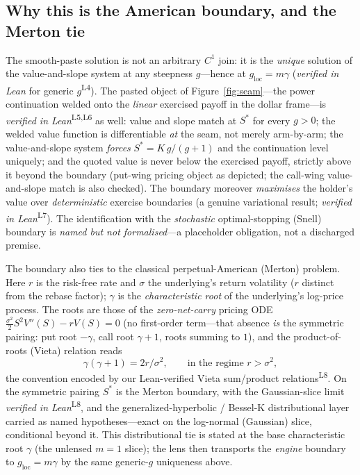 \documentclass[runningheads]{llncs}
\newcommand{\tfp}{\emph{verified in Lean}}
\begin{document}
\subsection{Why this is the American boundary, and the Merton tie}
The smooth-paste solution is not an arbitrary $C^{1}$ join: it is the
\emph{unique} solution of the value-and-slope system at any steepness $g$---hence
at $g_{\mathrm{loc}}=m\gamma$ (\tfp{} for generic $g$\textsuperscript{L4}). The pasted object of Figure~\ref{fig:seam}---the
power continuation welded onto the \emph{linear} exercised payoff in the dollar
frame---is \tfp{}\textsuperscript{L5,L6} as well: value and
slope match at $S^{\ast}$ for every $g>0$; the welded value function is
differentiable \emph{at} the seam, not merely arm-by-arm; the value-and-slope
system \emph{forces} $S^{\ast}=K\,g/(g+1)$ and the continuation level uniquely;
and the quoted value is never below the exercised payoff, strictly above it beyond
the boundary (put-wing pricing object as depicted; the call-wing value-and-slope
match is also checked). The boundary moreover \emph{maximises} the holder's value
over \emph{deterministic} exercise boundaries (a genuine variational result;
\tfp{}\textsuperscript{L7}). The identification with the \emph{stochastic}
optimal-stopping (Snell) boundary is \emph{named but not formalised}---a
placeholder obligation, not a discharged premise.

The boundary also ties to the classical perpetual-American (Merton) problem. Here
$r$ is the risk-free rate and $\sigma$ the underlying's return volatility ($r$
distinct from the rebase factor); $\gamma$ is the \emph{characteristic root} of
the underlying's log-price process. The roots are those of the
\emph{zero-net-carry} pricing ODE
$\tfrac{\sigma^{2}}{2}S^{2}V''(S)-rV(S)=0$ (no first-order term---that
absence \emph{is} the symmetric pairing: put root $-\gamma$, call root
$\gamma+1$, roots summing to $1$), and the product-of-roots (Vieta) relation
reads
\begin{equation}
  \gamma(\gamma+1)=2r/\sigma^{2},
  \qquad\text{in the regime }r>\sigma^{2},
  \label{eq:merton}
\end{equation}
the convention encoded by our Lean-verified Vieta sum/product
relations\textsuperscript{L8}. On the symmetric pairing $S^{\ast}$ is the Merton
boundary, with the Gaussian-slice limit \tfp{}\textsuperscript{L8}, and the
generalized-hyperbolic / Bessel-K distributional layer carried as
named hypotheses---exact on the log-normal (Gaussian) slice, conditional beyond it.
This distributional tie is stated at the base characteristic root $\gamma$ (the
unlensed $m=1$ slice); the lens then transports the \emph{engine} boundary to
$g_{\mathrm{loc}}=m\gamma$ by the same generic-$g$ uniqueness above.
\end{document}
